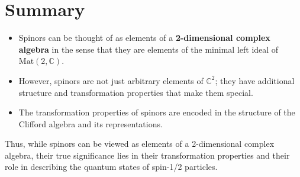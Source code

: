 \documentclass{article}
\begin{document}
\section*{Summary}

\begin{itemize}
\item Spinors can be thought of as elements of a \textbf{2-dimensional
complex algebra} in the sense that they are elements of the minimal left
ideal of $\text{Mat}(2, \mathbb{C})$. 

\item However, spinors are not just arbitrary elements of $\mathbb{C}^2$;
they have additional structure and transformation properties that make them
special. 

\item The transformation properties of spinors are encoded in the structure
of the Clifford algebra and its representations.
\end{itemize}

Thus, while spinors can be viewed as elements of a 2-dimensional complex
algebra, their true significance lies in their transformation properties and
their role in describing the quantum states of spin-1/2 particles.
\end{document}
